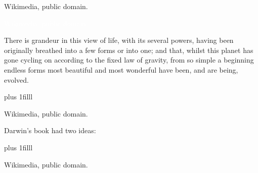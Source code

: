 \documentclass[t]{beamer}
\begin{document}
%
{
\begin{frame}[b]

	\hfill\Tiny Wikimedia, public domain.
\end{frame}
}
%
{
\begin{frame}[plain]
\end{frame}
}
%
{
\begin{frame}[t]
\end{frame}
}
%
{
\begin{frame}[t]{}
\end{frame}
}
%
{
\begin{frame}[b]
\hfill\tiny\textcolor{white}{Wikimedia, public domain.}
\end{frame}
}


{
\begin{frame}[t]

	\vspace*{3\baselineskip}

	\hangpara\parbox[t]{2.25in}{\raggedright %
There is grandeur in this view of life, with its several powers, having been originally breathed into a few forms or into one; and that, whilst this planet has gone cycling on according to the fixed law of gravity, from so simple a beginning endless forms most beautiful and most wonderful have been, and are being, evolved.}

	\vskip0pt plus 1filll
	
	\hfill\tiny Wikimedia, public domain.
\end{frame}
}
%
{
\begin{frame}[t]

	\vspace*{3\baselineskip}
	
	\hangpara Darwin's book had two ideas:
	
	\hangpara\hspace*{1em} 
	
	\hangpara\hspace*{1em}

	\vskip0pt plus 1filll
	
	\hfill\tiny Wikimedia, public domain.
\end{frame}
}
\end{document}
